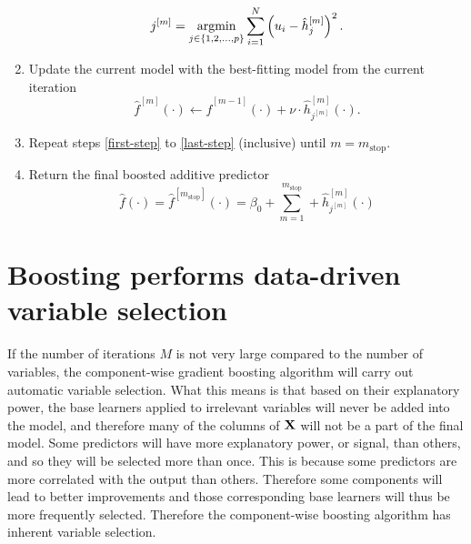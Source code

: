 \begin{algorithm}
\begin{enumerate}
\begin{equation}
            j^{[m]}=\operatorname*{argmin}_{j\in\{1,2,\ldots,p\}}\sum_{i=1}^N \left(u_i-\hat{h}_j^{[m]}\right)^2.
        \end{equation}
    \item\label{last-step} Update the current model with the best-fitting model from the current iteration
        \begin{equation}
            \hat{f}^{[m]}(\cdot)\gets \hat{f}^{[m-1]}(\cdot)+\nu\cdot \hat{h}_{j^{[m]}}^{[m]}(\cdot).
        \end{equation}
    \item Repeat steps \ref{first-step} to \ref{last-step} (inclusive) until $m=m_{\text{stop}}$.
    \item Return the final boosted additive predictor
        \begin{equation}
            \hat{f}(\cdot)=\hat{f}^{[m_{\text{stop}}]}(\cdot)=\beta_0+\sum_{m=1}^{m_{\text{stop}}}+\hat{h}_{j^{[m]}}^{[m]}(\cdot)
        \end{equation}
\end{enumerate}
\end{algorithm}

\section{Boosting performs data-driven variable selection}
If the number of iterations $M$ is not very large compared to the number of variables, the component-wise gradient boosting algorithm will carry out automatic variable selection. What this means is that based on their explanatory power, the base learners applied to irrelevant variables will never be added into the model, and therefore many of the columns of $\mathbf{X}$ will not be a part of the final model. Some predictors will have more explanatory power, or signal, than others, and so they will be selected more than once. This is because some predictors are more correlated with the output than others. Therefore some components will lead to better improvements and those corresponding base learners will thus be more frequently selected. Therefore the component-wise boosting algorithm has inherent variable selection.

